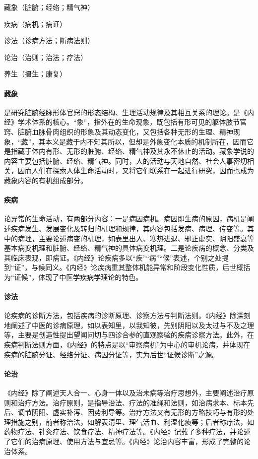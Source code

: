\documentclass[draft,12pt]{ctexbook}
\begin{document}
藏象（脏腑；经络；精气神）

疾病（病机；病证）

诊法（诊病方法；断病法则）

论治（治则；治法；疗法）

养生（摄生；康复）

\paragraph{藏象}	是研究脏腑经脉形体官窍的形态结构、生理活动规律及其相互关系的理论。是《内经》学术体系的核心。“象”，指外在的生命现象，既包括有形可见的躯体肢节官窍、脏腑血脉骨肉组织的形象及其动态变化，又包括各种无形的生理、精神现象，“藏”，其本义是藏于内不知其所以，但却是外象变化本质的机制所在，因而它是指藏于体内有形、无形的脏腑、经络、精气神及其永不休止的活动。藏象学说的内容主要包括脏腑、经络、精气神。同时，人的活动与天地自然、社会人事密切相关，因而人们在探索人体生命活动时，又将它们联系在一起进行研究，因而也成为藏象内容的有机组成部分。

\paragraph{疾病}	论异常的生命活动，有两部分内容：一是病因病机。病因即生病的原因，病机是阐述疾病发生、发展变化及转归的机理和规律，其内容包括发病、病理、传变等。其中的病理，主要论述病变的机理，如表里出入、寒热进退、邪正虚实、阴阳盛衰等基本病变机理和脏腑、经络、精气神的具体病变机理。二是论疾病的概念、分类及其临床表现，即病证。《内经》论疾病多以“疾”“病”“候”表述，个别之处提到“证”，与候同义。《内经》论疾病重其整体机能异常和阶段变化性质，后世概括为“证候”，体现了中医学疾病学理论的特色。

\paragraph{诊法}	论疾病的诊断方法，包括疾病的诊断原理、诊察方法与判断法则。《内经》除深刻地阐述了中医的诊病原理，如以表知里，以我知彼，先别阴阳以及太过与不及之理等，主要是创造性提出望闻问切与四诊合参的直观察验的疾病诊察方法。此外，在疾病判断法则方面，《内经》的特点是以“审察病机”为中心的审机论病，并体现在疾病的脏腑分证、经络分证、病因分证等，实为后世“证候诊断”之源。

\paragraph{论治}	《内经》除了阐述天人合一、心身一体以及治未病等治疗思想外，主要阐述治疗原则和治疗方法。治疗原则，是指导治法、疗法的准绳和法则，如治病求本、标本先后、调节阴阳、虚实补泻、因势利导等。治疗方法又有无形的方略技巧与有形的处理措施之别，前者称治法，如解表清里、理气活血、利湿化痰等；后者称疗法，如药物疗法、针灸疗法、饮食疗法、精神疗法等。《内经》记载了多种疗法，并论述了它们的治病原理、使用方法与宜忌等。《内经》论治内容丰富，形成了完整的论治体系。
\end{document}
